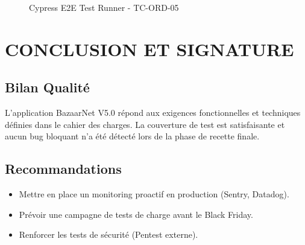 \documentclass[12pt,a4paper]{article}
\begin{document}
\begin{figure}[H]
    \centering
    \caption{Cypress E2E Test Runner - TC-ORD-05}
\end{figure}

\newpage

\section{CONCLUSION ET SIGNATURE}

\subsection{Bilan Qualité}
L'application BazaarNet V5.0 répond aux exigences fonctionnelles et techniques définies dans le cahier des charges. La couverture de test est satisfaisante et aucun bug bloquant n'a été détecté lors de la phase de recette finale.

\subsection{Recommandations}
\begin{itemize}
    \item Mettre en place un monitoring proactif en production (Sentry, Datadog).
    \item Prévoir une campagne de tests de charge avant le Black Friday.
    \item Renforcer les tests de sécurité (Pentest externe).
\end{itemize}
\end{document}
